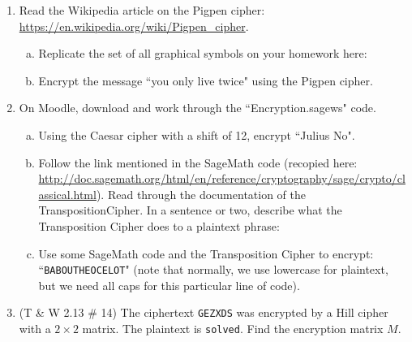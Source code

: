 \documentclass[12pt]{amsart}
\theoremstyle{plain}
\theoremstyle{definition}
\begin{document}
\begin{enumerate}[1.]
	\item Read the Wikipedia article on the Pigpen cipher:\\ \url{https://en.wikipedia.org/wiki/Pigpen_cipher}.
	\begin{enumerate}[a.]
	\item Replicate the set of all graphical symbols on your homework here:
	\begin{framed}
	\vspace{1.8in}
	\end{framed}
	\item Encrypt the message ``you only live twice" using the Pigpen cipher.
	\begin{framed}
	\vspace{2in}
	\end{framed}
	\end{enumerate}
	\item On Moodle, download and work through the ``Encryption.sagews" code.\\
		\begin{enumerate}[a.]
		\item Using the Caesar cipher with a shift of 12, encrypt ``Julius No".\\
		\begin{framed}
		\vspace{1in}
		\end{framed}
		\item Follow the link mentioned in the SageMath code (recopied here: \url{http://doc.sagemath.org/html/en/reference/cryptography/sage/crypto/classical.html}).  Read through the documentation of the TranspositionCipher.  In a sentence or two, describe what the Transposition Cipher does to a plaintext phrase:
		\begin{framed}
		\vspace{2.5in}
		\end{framed}
		\item Use some SageMath code and the Transposition Cipher to encrypt: ``\texttt{BABOUTHEOCELOT}" (note that normally, we use lowercase for plaintext, but we need all caps for this particular line of code).
		\begin{framed}
		\vspace{2in}
		\end{framed}
		\end{enumerate}
	\newpage \item (T \& W 2.13 \# 14) The ciphertext \texttt{GEZXDS} was encrypted by a Hill cipher with a $2 \times 2$ matrix.  The plaintext is \texttt{solved}.  Find the encryption matrix $M$.

\end{enumerate}
\end{document}
